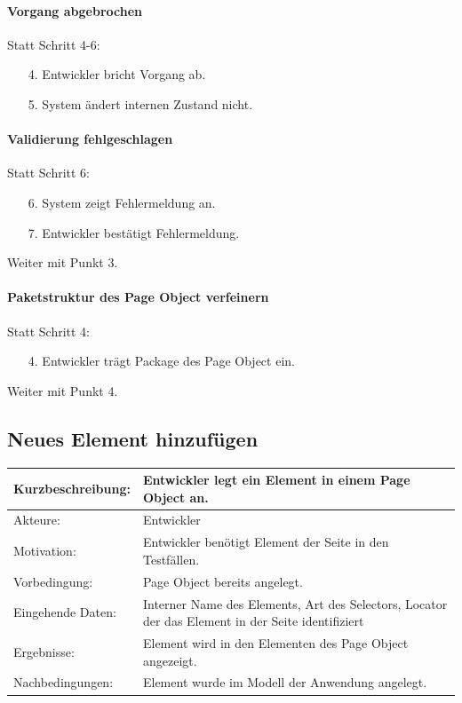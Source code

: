 \paragraph{Vorgang abgebrochen}
Statt Schritt 4-6:
\begin{itemize}[itemsep=0pt]
\item[4.] Entwickler bricht Vorgang ab. 
\item[5.] System ändert internen Zustand nicht. 
\end{itemize}

\paragraph{Validierung fehlgeschlagen}
Statt Schritt 6:
\begin{itemize}[itemsep=0pt]
\item[6.] System zeigt Fehlermeldung an. 
\item[7.] Entwickler bestätigt Fehlermeldung. 
\end{itemize}
Weiter mit Punkt 3. 

\paragraph{Paketstruktur des Page Object verfeinern}
Statt Schritt 4:
\begin{itemize}[itemsep=0pt]
\item[4.] Entwickler trägt Package des Page Object ein.
\end{itemize}
Weiter mit Punkt 4. 
 

\subsection{Neues Element hinzufügen}
\label{sec:neues_element_hinzufügen}

\begin{tabular}[h]{|p{4cm}|p{}|}
\hline 
\rule[-1ex]{0pt}{2.5ex}Kurzbeschreibung: & 
Entwickler legt ein Element in einem Page Object an. \\  
\hline 
\rule[-1ex]{0pt}{2.5ex}Akteure: & 
Entwickler \\ 
\hline 
\rule[-1ex]{0pt}{2.5ex}Motivation: & 
Entwickler benötigt Element der Seite in den Testfällen. \\ 
\hline 
\rule[-1ex]{0pt}{2.5ex}Vorbedingung: & 
Page Object bereits angelegt.\\ 
\hline 
\rule[-1ex]{0pt}{2.5ex}Eingehende Daten: & Interner Name des Elements, Art des Selectors, Locator der das Element in der Seite identifiziert \\ 
\hline 
\rule[-1ex]{0pt}{2.5ex}Ergebnisse: & Element wird in den Elementen des Page Object angezeigt. \\ 
\hline 
\rule[-1ex]{0pt}{2.5ex}Nachbedingungen: & Element wurde im Modell der Anwendung angelegt.  \\ 
\hline 
\end{tabular} 

